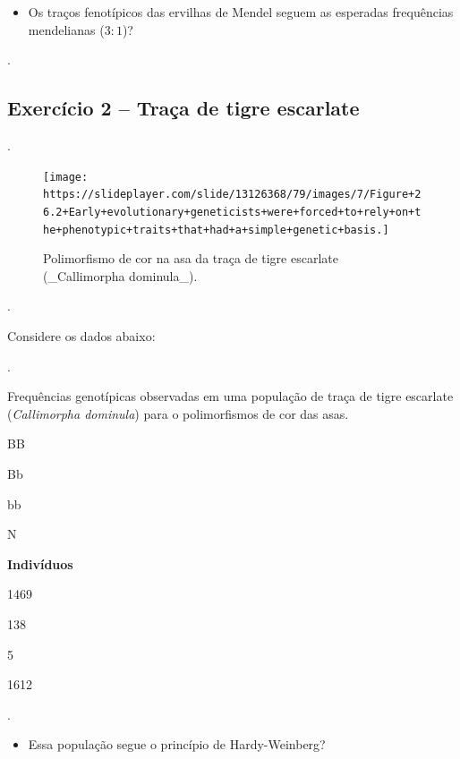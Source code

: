 \documentclass[
]{book}
\providecommand{\tightlist}{%
  \setlength{\itemsep}{0pt}\setlength{\parskip}{0pt}}
\begin{document}
\begin{itemize}
\tightlist
\item
  Os traços fenotípicos das ervilhas de Mendel seguem as esperadas frequências mendelianas (\(3:1\))?
\end{itemize}

.\linebreak

\hypertarget{exercuxedcio-2-trauxe7a-de-tigre-escarlate}{%
\subsection{Exercício 2 -- Traça de tigre escarlate}\label{exercuxedcio-2-trauxe7a-de-tigre-escarlate}}

.\linebreak

\begin{figure}

{\centering \texttt{[image: https://slideplayer.com/slide/13126368/79/images/7/Figure+26.2+Early+evolutionary+geneticists+were+forced+to+rely+on+the+phenotypic+traits+that+had+a+simple+genetic+basis.]} 

}

\caption{Polimorfismo de cor na asa da traça de tigre escarlate (_Callimorpha dominula_).}\label{fig:callimorpha}
\end{figure}

.\linebreak

Considere os dados abaixo:

.\linebreak

\label{tab:tableA09}Frequências genotípicas observadas em uma população de traça de tigre escarlate (\emph{Callimorpha dominula}) para o polimorfismos de cor das asas.

BB

Bb

bb

N

\textbf{Indivíduos}

1469

138

5

1612

.\linebreak

\begin{itemize}
\tightlist
\item
  Essa população segue o princípio de Hardy-Weinberg?
\end{itemize}
\end{document}
